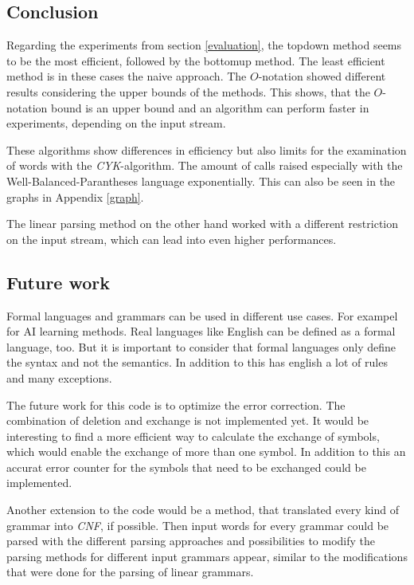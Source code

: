 \documentclass[a4paper, 11pt]{article}
\begin{document}
\subsection{Conclusion}


Regarding the experiments from section \ref{evaluation}, the topdown method seems to be the most efficient, followed by the bottomup method. The least efficient method is in these cases the naive approach. The $O$-notation showed different results considering the upper bounds of the methods. This shows, that the $O$-notation bound is an upper bound and an algorithm can perform faster in experiments, depending on the input stream.


These algorithms show differences in efficiency but also limits for the examination of words with the \textit{CYK}-algorithm. The amount of calls raised especially with the Well-Balanced-Parantheses language exponentially. This can also be seen in the graphs in Appendix \ref{graph}.

The linear parsing method on the other hand worked with a different restriction on the input stream, which can lead into even higher performances.


\subsection{Future work}

Formal languages and grammars can be used in different use cases. For exampel for AI learning methods. Real languages like English can be defined as a formal language, too. But it is important to consider that formal languages only define the syntax and not the semantics. In addition to this has english a lot of rules and many exceptions. \cite{FG}

The future work for this code is to optimize the error correction. The combination of deletion and exchange is not implemented yet. It would be interesting to find a more efficient way to calculate the exchange of symbols, which would enable the exchange of more than one symbol.
In addition to this an accurat error counter for the symbols that need to be exchanged could be implemented.

Another extension to the code would be a method, that translated every kind of grammar into \textit{CNF}, if possible. Then input words for every grammar could be parsed with the different parsing approaches and possibilities to modify the parsing methods for different input grammars appear, similar to the modifications that were done for the parsing of linear grammars.
\end{document}
